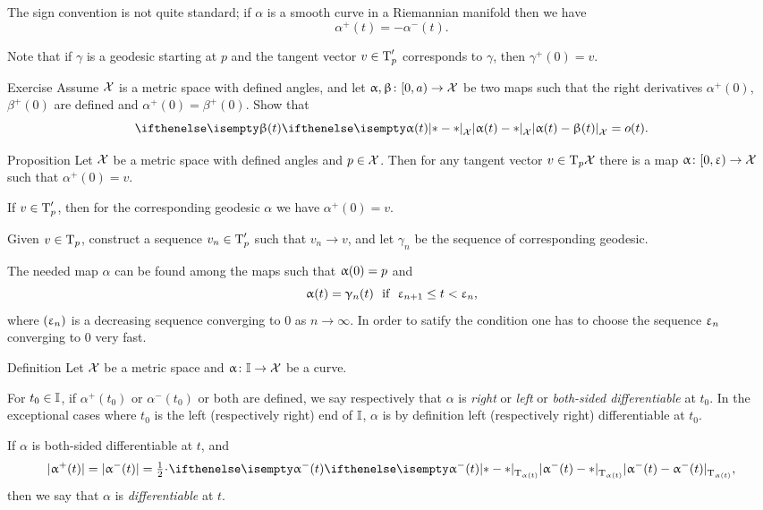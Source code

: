 The sign convention is not quite standard; if $\alpha$ is a smooth curve in a Riemannian manifold then we have
\[\alpha^+(t)=-\alpha^-(t).\]

Note that if $\gamma$ is a geodesic starting at $p$ 
and the tangent vector $v\in\T_p'$ corresponds to $\gamma$, 
then $\gamma^+(0)=v$.

\begin{thm}{Exercise}\label{ex:tangent-vect=o(t)}
Assume $\mathcal{X}$ is a metric space with defined angles,
and let $\alpha,\beta\:[0,a)\to\spc{X}$ 
be two maps such that the right derivatives $\alpha^+(0)$, $\beta^+(0)$ are defined and $\alpha^+(0)=\beta^+(0)$.
Show that
\[\dist{\alpha(t)}{\beta(t)}{\spc{X}}=o(t).\]
\end{thm}

\begin{thm}{Proposition}
Let $\mathcal{X}$ be a metric space with defined angles and $p\in \spc{X}$.
Then for any tangent vector $v\in\T_p\spc{X}$ there is a map $\alpha\:[0,\eps)\to \spc{X}$ such that $\alpha^+(0)=v$.
\end{thm}

If $v\in \T_p'$, then for the corresponding geodesic $\alpha$ we have $\alpha^+(0)=v$.

Given $v\in \T_p$, construct a sequence $v_n\in\T'_p$ 
such that $v_n\to v$, and let $\gamma_n$ be the sequence of corresponding geodesic.

The needed map $\alpha$ can be found among the maps such that $\alpha(0)\z=p$ and
\[\alpha(t)=\gamma_n(t)\ \ \text{if}\ \ \eps_{n+1}\le t<\eps_n,\]
where $(\upvarepsilon_n)$
is a decreasing sequence converging to $0$ as $n\to\infty$.
In order to satify the condition one has to choose the sequence $\upvarepsilon_n$ converging to $0$ very fast.
\qeds

\begin{thm}{Definition}\label{def:diff-curv}
Let 
$\mathcal{X}$ be a metric space 
and $\alpha\:\II\to \spc{X}$ be a curve.

For $t_0\in\II$, 
if $\alpha^+(t_0)$ or $\alpha^-(t_0)$ or both are defined,
we say respectively that $\alpha$ is \emph{right} or \emph{left} or \emph{both-sided differentiable} at $t_0$.
In the exceptional cases where $t_0$ is the left (respectively right) end of $\mathbb{I}$, $\alpha$ is by definition left (respectively right) differentiable at $t_0$.

If $\alpha$ is both-sided differentiable at $t$, and 
\[|\alpha^+(t)|=|\alpha^-(t)|=\tfrac12\cdot\dist{\alpha^-(t)}{\alpha^-(t)}{\T_{\alpha(t)}},\] then we say that $\alpha$ is \emph{differentiable} at $t$.
\end{thm}

